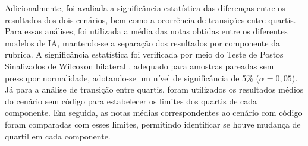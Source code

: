 Adicionalmente, foi avaliada a significância estatística das diferenças entre os resultados dos dois cenários, bem como a ocorrência de transições entre quartis. Para essas análises, foi utilizada a média das notas obtidas entre os diferentes modelos de IA, mantendo-se a separação dos resultados por componente da rubrica. A significância estatística foi verificada por meio do Teste de Postos Sinalizados de Wilcoxon bilateral \cite{wilcoxon1945individual}, adequado para amostras pareadas sem pressupor normalidade, adotando-se um nível de significância de 5\% ($\alpha = 0{,}05$). Já para a análise de transição entre quartis, foram utilizados os resultados médios do cenário sem código para estabelecer os limites dos quartis de cada componente. Em seguida, as notas médias correspondentes ao cenário com código foram comparadas com esses limites, permitindo identificar se houve mudança de quartil em cada componente.